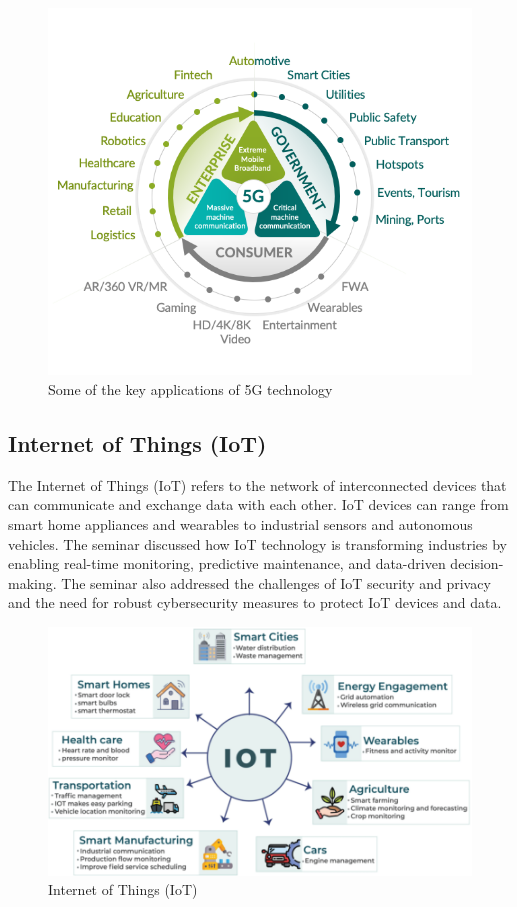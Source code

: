 \documentclass[conference]{IEEEtran}
\begin{document}
\begin{figure}[htbp]
    \centering
    \includegraphics[width=\linewidth]{images/5g-applications.png}
    \caption{Some of the key applications of 5G technology}
    \label{fig:5g-applications}
\end{figure}

\subsection{Internet of Things (IoT)}
The Internet of Things (IoT) refers to the network of interconnected devices that can communicate and exchange data with each other. IoT devices can range from smart home appliances and wearables to industrial sensors and autonomous vehicles. \cite{DBLP:conf/iot/2023} The seminar discussed how IoT technology is transforming industries by enabling real-time monitoring, predictive maintenance, and data-driven decision-making. The seminar also addressed the challenges of IoT security and privacy and the need for robust cybersecurity measures to protect IoT devices and data. 
\begin{figure}[htbp]
    \centering
    \includegraphics[width=\linewidth]{images/iot.png}
    \caption{Internet of Things (IoT)}
    \label{fig:iot}
\end{figure}
\end{document}
